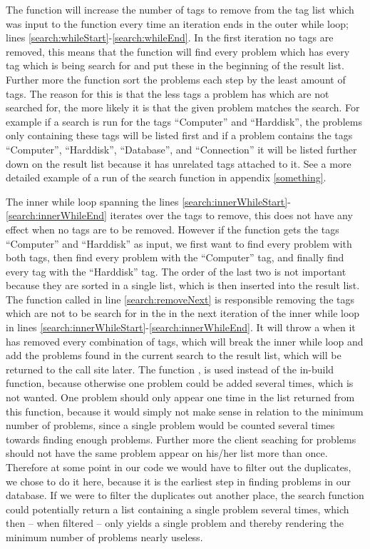 The function will increase the number of tags to remove from the tag list which was input to the function every time an iteration ends in the outer while loop; lines \ref{search:whileStart}-\ref{search:whileEnd}.
In the first iteration no tags are removed, this means that the function will find every problem which has every tag which is being search for and put these in the beginning of the result list.
Further more the function sort the problems each step by the least amount of tags. The reason for this is that the less tags a problem has which are not searched for, the more likely it is that the given problem matches the search.
For example if a search is run for the tags ``Computer'' and ``Harddisk'', the problems only containing these tags will be listed first and if a problem contains the tags ``Computer'', ``Harddisk'', ``Database'', and ``Connection'' it will be listed further down on the result list because it has unrelated tags attached to it.
See a more detailed example of a run of the search function in appendix \ref{something}.

The inner while loop spanning the lines \ref{search:innerWhileStart}-\ref{search:innerWhileEnd} iterates over the tags to remove, this does not have any effect when no tags are to be removed.
However if the function gets the tags ``Computer'' and ``Harddisk'' as input, we first want to find every problem with both tags, then find every problem with the ``Computer'' tag, and finally find every tag with the ``Harddisk'' tag.
The order of the last two is not important because they are sorted in a single list, which is then inserted into the result list.
The  function called in line \ref{search:removeNext} is responsible removing the tags which are not to be search for in the in the next iteration of the inner while loop in lines \ref{search:innerWhileStart}-\ref{search:innerWhileEnd}.
It will throw a  when it has removed every combination of tags, which will break the inner while loop and add the problems found in the current search to the result list, which will be returned to the call site later.
The function , is used instead of the in-build  function, because otherwise one problem could be added several times, which is not wanted.
One problem should only appear one time in the list returned from this function, because it would simply not make sense in relation to the minimum number of problems, since a single problem would be counted several times towards finding enough problems.
Further more the client seaching for problems should not have the same problem appear on his/her list more than once.
Therefore at some point in our code we would have to filter out the duplicates, we chose to do it here, because it is the earliest step in finding problems in our database.
If we were to filter the duplicates out another place, the search function could potentially return a list containing a single problem several times, which then -- when filtered -- only yields a single problem and thereby rendering the minimum number of problems nearly useless.

